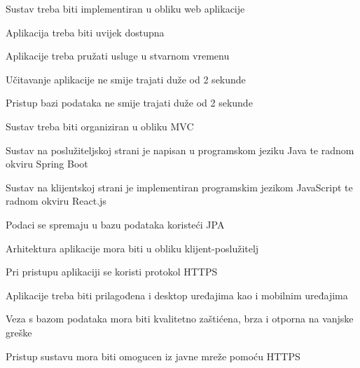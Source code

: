 			\begin{packed_item}
			\item Sustav treba biti implementiran u obliku web aplikacije
			\item Aplikacija treba biti uvijek dostupna
			\item Aplikacije treba pružati usluge u stvarnom vremenu
			\item Učitavanje aplikacije ne smije trajati duže od 2 sekunde
			\item Pristup bazi podataka ne smije trajati duže od 2 sekunde
			\item Sustav treba biti organiziran u obliku MVC
			\item Sustav na poslužiteljskoj strani je napisan u programskom jeziku Java te radnom okviru Spring Boot
			\item Sustav na klijentskoj strani je implementiran programskim jezikom JavaScript te radnom okviru React.js
			\item Podaci se spremaju u bazu podataka koristeći JPA
			\item Arhitektura aplikacije mora biti u obliku klijent-poslužitelj
			\item Pri pristupu aplikaciji se koristi protokol HTTPS
			\item Aplikacije treba biti prilagođena i desktop uređajima kao i mobilnim uređajima
			\item Veza s bazom podataka mora biti kvalitetno zaštićena, brza i otporna na vanjske greške
			\item Pristup sustavu mora biti omogucen iz javne mreže pomoću HTTPS
			\end{packed_item}
			 